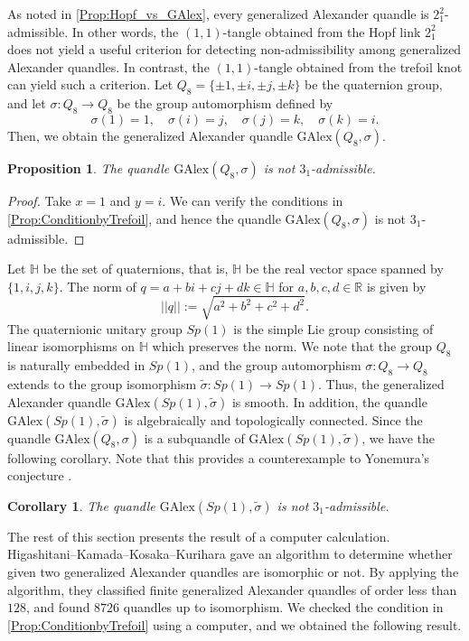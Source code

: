 \documentclass[12pt]{article}
\theoremstyle{plain}
\newtheorem{prop}[thm]{Proposition}
\newtheorem{cor}[thm]{Corollary}
\theoremstyle{definition}
\newcommand{\HH}{\mathbb{H}}
\newcommand{\RR}{\mathbb{R}}
\newcommand{\GAlex}{\mathrm{GAlex}}
\begin{document}
As noted in \cref{Prop:Hopf_vs_GAlex}, 
every generalized Alexander quandle is $2_1^2$-admissible.
In other words, the $(1, 1)$-tangle obtained from the Hopf link $2_{1}^{2}$ does not yield a useful criterion for detecting non-admissibility among generalized Alexander quandles.
In contrast, the $(1, 1)$-tangle obtained from the trefoil knot can yield such a criterion.
Let $Q_8 = \{\pm 1, \pm i, \pm j, \pm k\}$ be the quaternion group, and let $\sigma: Q_8 \to Q_8$ be the group automorphism defined by 
\[
  \sigma(1) = 1, \quad \sigma(i) = j, \quad \sigma (j) = k, \quad \sigma(k) = i.
\]
Then, we obtain the generalized Alexander quandle $\mathrm{GAlex}(Q_8, \sigma)$.
\begin{prop}\label{prop:GAlexQ8}
  The quandle $\GAlex(Q_8, \sigma)$ is not $3_1$-admissible.
\end{prop}
\begin{proof}
  Take $x = 1$ and $y = i$. We can verify the conditions in \cref{Prop:ConditionbyTrefoil}, and hence the quandle $\GAlex(Q_8, \sigma)$ is not $3_1$-admissible.
\end{proof}

Let $\HH$ be the set of quaternions, that is, $\HH$ be the real vector space spanned by $\{1, i, j, k\}$.
The norm of $q = a + bi + cj + dk \in \HH$ for $a,b,c,d \in \RR$ is given by 
\[
  ||q|| := \sqrt{a^2+b^2+c^2+d^2}.
\]
The quaternionic unitary group $Sp(1)$ is the simple Lie group consisting of linear isomorphisms on $\HH$ which preserves the norm.
We note that the group $Q_8$ is naturally embedded in $Sp(1)$, and the group automorphism $\sigma: Q_8 \to Q_8$ extends to the group isomorphism $\widetilde{\sigma}: Sp(1) \to Sp(1)$.
Thus, the generalized Alexander quandle $\GAlex(Sp(1), \widetilde{\sigma})$ is smooth.
In addition,
the quandle $\GAlex(Sp(1), \widetilde{\sigma})$ is algebraically and topologically connected.
Since the quandle $\GAlex(Q_8, \sigma)$ is a subquandle of $\GAlex(Sp(1), \widetilde{\sigma})$, we have the following corollary.
Note that this provides a counterexample to Yonemura's conjecture \cite{Yonemura2024}.

\begin{cor}
  The quandle $\GAlex(Sp(1), \widetilde{\sigma})$ is not $3_1$-admissible. 
\end{cor}

The rest of this section presents the result of a computer calculation. 
Higashitani--Kamada--Kosaka--Kurihara \cite{Higashitani-2024-ClassificationGeneralizedAlexanderQuandlesa} gave an algorithm to determine whether given two generalized Alexander quandles are isomorphic or not.
By applying the algorithm, they classified finite generalized Alexander quandles of order less than $128$, 
and found $8726$ quandles up to isomorphism.
We checked the condition in \cref{Prop:ConditionbyTrefoil}  using a computer, and we obtained the following result.
\end{document}
